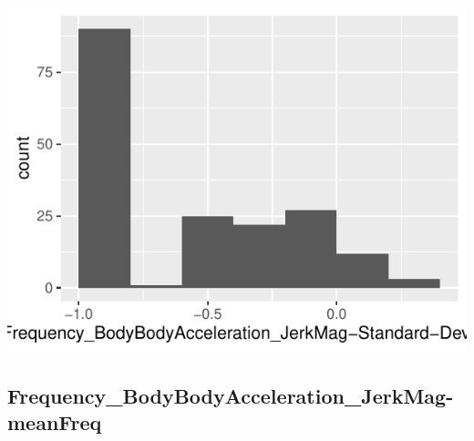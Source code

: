 \documentclass[
]{article}
\begin{document}
\begin{minipage}{0.25 \textwidth}

\includegraphics{codebook_tidydatasub_files/figure-latex/Var-74-Frequency-BodyBodyAcceleration-JerkMag-Standard-Deviation--1.pdf}

\end{minipage}

\noindent\makebox[\linewidth]{\rule{\textwidth}{0.4pt}}

\hypertarget{frequency_bodybodyacceleration_jerkmag-meanfreq}{%
\subsection{Frequency\_BodyBodyAcceleration\_JerkMag-meanFreq}\label{frequency_bodybodyacceleration_jerkmag-meanfreq}}
\end{document}
